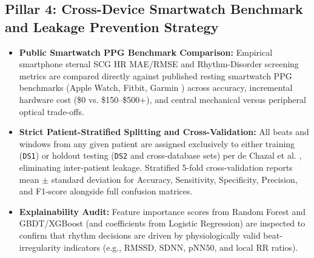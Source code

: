 \subsection{Pillar 4: Cross-Device Smartwatch Benchmark and Leakage Prevention Strategy}
\begin{itemize}
	\item \textbf{Public Smartwatch PPG Benchmark Comparison:} Empirical smartphone sternal SCG HR MAE/RMSE and Rhythm-Disorder screening metrics are compared directly against published resting smartwatch PPG benchmarks (Apple Watch, Fitbit, Garmin \cite{bent2020investigating, nelson2019accuracy, perez2019large, lubitz2022detection}) across accuracy, incremental hardware cost (\$0 vs. \$150--\$500+), and central mechanical versus peripheral optical trade-offs.
	\item \textbf{Strict Patient-Stratified Splitting and Cross-Validation:} All beats and windows from any given patient are assigned exclusively to either training (\texttt{DS1}) or holdout testing (\texttt{DS2} and cross-database sets) per de Chazal et al. \cite{dechazal2004automatic}, eliminating inter-patient leakage. Stratified 5-fold cross-validation reports mean $\pm$ standard deviation for Accuracy, Sensitivity, Specificity, Precision, and F1-score alongside full confusion matrices.
	\item \textbf{Explainability Audit:} Feature importance scores from Random Forest and GBDT/XGBoost (and coefficients from Logistic Regression) are inspected to confirm that rhythm decisions are driven by physiologically valid beat-irregularity indicators (e.g., $\text{RMSSD}$, $\text{SDNN}$, $\text{pNN50}$, and local RR ratios).
\end{itemize}